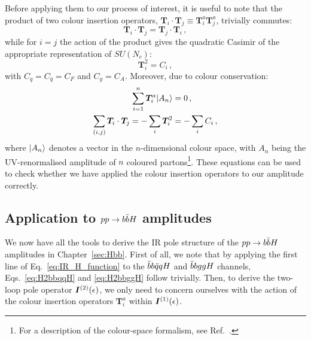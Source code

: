 \documentclass[main.tex]{subfiles}
\begin{document}
Before applying them to our process of interest, it is useful to note that the product of two colour insertion operators, $\bm{T}_i\cdot\bm{T}_j \equiv \bm{T}_i^a \bm{T}_j^a$, trivially commutes: 
\begin{equation} \label{eq:TiTjcommute}
    \bm{T}_i\cdot\bm{T}_j = \bm{T}_j\cdot\bm{T}_i\,,
\end{equation}
while for $i=j$ the action of the product gives the quadratic Casimir of the appropriate representation of $SU(N_c)$:
\begin{equation} \label{eq:Ti^2eqCi}
    \bm{T}_i^2 = C_i\,,
\end{equation}
with $C_q = C_{\bar{q}} = C_F$ and $C_g=C_A$. Moreover, due to colour conservation:
\begin{align} 
    \sum_{i=1}^n \bm{T}_i^a |A_n \rangle &= 0\,, \label{eq:poleinsertioncheckA} \\
    \sum_{(i,j)} \bm{T}_i \cdot \bm{T}_j = -\sum_i \bm{T}_i^2 &= -\sum_i C_i\,, \label{eq:poleinsertioncheckB}
\end{align}
where $|A_n \rangle$ denotes a vector in the $n$-dimensional colour space, with $A_n$ being the UV-renormalised amplitude of $n$ coloured partons\footnote{For a description of the colour-space formalism, see Ref.~\cite{Catani:1996vz}.}. These equations can be used to check whether we have applied the colour insertion operators to our amplitude correctly.
\subsection{Application to $pp \rightarrow b\bar{b}H$ amplitudes}
We now have all the tools to derive the IR pole structure of the $pp \rightarrow b\bar{b}H$ amplitudes in Chapter~\ref{sec:Hbb}. First of all, we note that by applying the first line of Eq.~\ref{eq:IR_H_function} to the $\bar{b}b\bar{q}qH$ and $\bar{b}bggH$ channels, Eqs.~\ref{eq:H2bbqqH} and \ref{eq:H2bbggH} follow trivially. Then, to derive the two-loop pole operator $\bm{I}^{(2)}(\epsilon)$, we only need to concern ourselves with the action of the colour insertion operators $\bm{T}_i^a$ within $\bm{I}^{(1)}(\epsilon)$.
\end{document}
